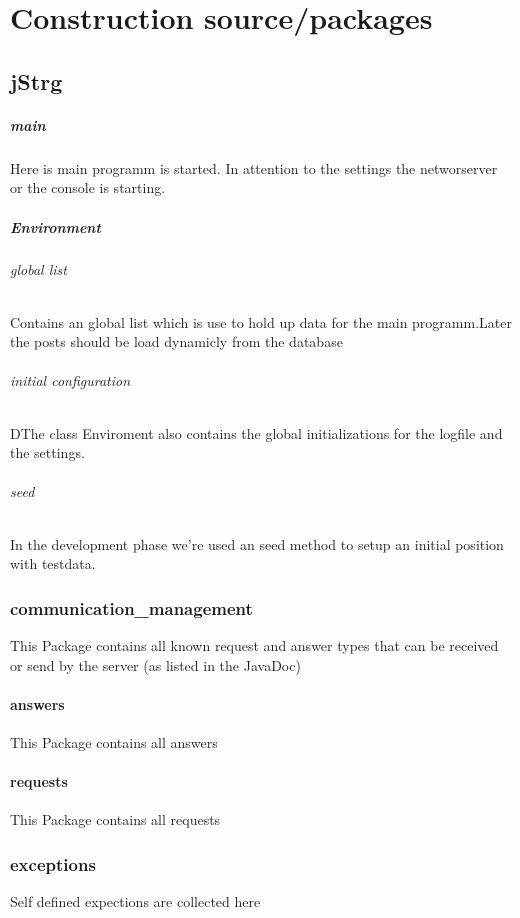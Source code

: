 \documentclass
[   oneside,         %
    12pt,            %
    DIV15,           %
    headsepline,     %
    footsepline,     %
    openright,       %
    a4paper,         %
    abstracton,      %
    titlepage,       %
    headinclude,     %
]   {scrreprt}       %
\begin{document}
	
	
	\part{Construction source/packages}
	\chapter{jStrg}
	\subsubsection{main}
	 Here is main programm is started. In attention to the settings the networserver or the console is starting.
	\subsubsection{Environment}
	\paragraph{global list}
	Contains an global list which is use to hold up data for the main programm.Later the posts should be load dynamicly from the database
	\paragraph{initial configuration}
	DThe class Enviroment also contains the global initializations for the logfile and the settings.
	\paragraph{seed}
	In the development phase we're used an seed method to setup an initial position with testdata.
	\section{communication\_management}
	This Package contains all known request and answer types that can be received or send by the server (as listed in the JavaDoc)
	\subsection{answers}
	This Package contains all answers
	\subsection{requests}
	This Package contains all requests	
	\section{exceptions}
	Self defined expections are collected here
	
\end{document}
